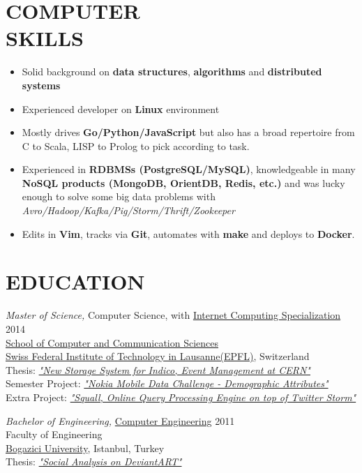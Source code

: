 \documentclass[line, margin]{res}
\begin{document}
\begin{resume}
\section{COMPUTER \\ SKILLS}
\begin{itemize}
  \item Solid background on \textbf{data structures}, \textbf{algorithms} and \textbf{distributed systems}
  \item Experienced developer on \textbf{Linux} environment
  \item Mostly drives \textbf{Go/Python/JavaScript} but also has a broad repertoire from C to Scala, LISP to Prolog to pick according to task.
  \item Experienced in \textbf{RDBMSs (PostgreSQL/MySQL)}, knowledgeable in many \textbf{NoSQL products (MongoDB, OrientDB, Redis, etc.)} and was lucky enough to solve some big data problems with \textit{Avro/Hadoop/Kafka/Pig/Storm/Thrift/Zookeeper}
  \item Edits in \textbf{Vim}, tracks via \textbf{Git}, automates with \textbf{make} and deploys to \textbf{Docker}.
\end{itemize}

\section{EDUCATION}
{\sl Master of Science,} Computer Science, with \href{http://ic.epfl.ch/specializations#content}{Internet Computing Specialization} \hfill{2014} \\
  \href{http://ic.epfl.ch}{School of Computer and Communication Sciences} \\
  \href{http://epfl.ch}{Swiss Federal Institute of Technology in Lausanne(EPFL)}, Switzerland \\
  Thesis: \textit{\href{http://indico-software.org/}{"New Storage System for Indico, Event Management at CERN"}} \\
  Semester Project: \textit{\href{http://research.nokia.com/page/12000}{"Nokia Mobile Data Challenge - Demographic Attributes"}} \\
  Extra Project: \textit{\href{https://github.com/epfldata/squall}{"Squall, Online Query Processing Engine on top of Twitter Storm"}}

{\sl Bachelor of Engineering,} \href{http://www.cmpe.boun.edu.tr/}{Computer Engineering} \hfill{2011} \\
  Faculty of Engineering \\
  \href{http://boun.edu.tr/en-US/Content/Default.aspx}{Bogazici University}, Istanbul, Turkey \\
  Thesis: \textit{\href{https://github.com/ferhatelmas/deviantART-analysis}{"Social Analysis on DeviantART"}}

\end{resume}
\end{document}
